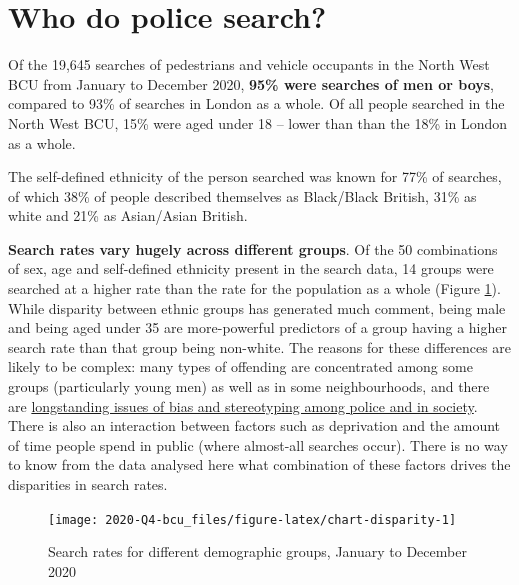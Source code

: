 \documentclass[
  a4paper,
  twoside, 11pt]{article}
\begin{document}
\hypertarget{who-do-police-search}{%
\section{Who do police search?}\label{who-do-police-search}}

Of the 19,645 searches of pedestrians and vehicle occupants in the North West BCU from January to December 2020, \textbf{95\% were searches of men or boys}, compared to 93\% of searches in London as a whole. Of all people searched in the North West BCU, 15\% were aged under 18 -- lower than than the 18\% in London as a whole.

The self-defined ethnicity of the person searched was known for 77\% of searches, of which 38\% of people described themselves as Black/Black British, 31\% as white and 21\% as Asian/Asian British.

\textbf{Search rates vary hugely across different groups}. Of the 50 combinations of sex, age and self-defined ethnicity present in the search data, 14 groups were searched at a higher rate than the rate for the population as a whole (Figure \ref{fig:chart-disparity}). While disparity between ethnic groups has generated much comment, being male and being aged under 35 are more-powerful predictors of a group having a higher search rate than that group being non-white. The reasons for these differences are likely to be complex: many types of offending are concentrated among some groups (particularly young men) as well as in some neighbourhoods, and there are \href{https://www.bbc.co.uk/news/uk-47300343}{longstanding issues of bias and stereotyping among police and in society}. There is also an interaction between factors such as deprivation and the amount of time people spend in public (where almost-all searches occur). There is no way to know from the data analysed here what combination of these factors drives the disparities in search rates.



\begin{figure}[h]

{\centering \texttt{[image: 2020-Q4-bcu\_files/figure-latex/chart-disparity-1]} 

}

\caption{Search rates for different demographic groups, January to December 2020}\label{fig:chart-disparity}
\end{figure}
\end{document}
